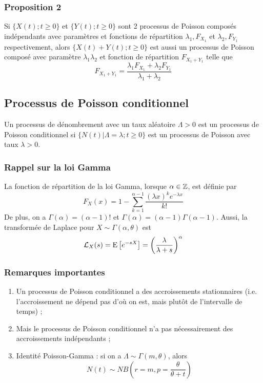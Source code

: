 \documentclass[10pt, french, landscape]{article}
\begin{document}
\begin{multicols*}{2}
\subsubsection*{Proposition 2}
Si $\{ X(t) ; t \geq 0 \}$ et $\{ Y(t) ; t \geq 0 \}$ sont 2 processus de Poisson composés indépendants avec paramètres et fonctions de répartition $\lambda_1, F_{X_1}$ et $\lambda_2, F_{Y_1}$ respectivement, alors $\{ X(t) + Y(t) ; t \geq 0 \}$ est aussi un processus de Poisson composé avec paramètre $\lambda_1  \lambda_2$ et fonction de répartition $F_{X_1 + Y_1}$ telle que
\[F_{X_1 + Y_1} = \frac{\lambda_1 F_{X_1} + \lambda_2 F_{Y_1}}{\lambda_1 + \lambda_2}  \]

\subsection*{Processus de Poisson conditionnel}
\begin{definition}[Définition]
Un processus de dénombrement avec un taux aléatoire $\Lambda > 0$ est un processus de Poisson conditionnel si $\{ N(t) | \Lambda = \lambda ; t \geq 0 \}$ est un processus de Poisson avec taux $\lambda > 0$.
\end{definition}

\subsubsection*{Rappel sur la loi Gamma}
La fonction de répartition de la loi Gamma, lorsque $\alpha \in \mathbb{Z}$, est définie par
\[F_X(x) = 1 - \sum_{k=1}^{\alpha-1} \frac{(\lambda x)^k e^{-\lambda x}}{k!}\]
De plus, on a $\Gamma(\alpha) = (\alpha-1)!$ et $\Gamma(\alpha) = (\alpha - 1) \Gamma(\alpha - 1)$. Aussi, la transformée de Laplace pour $X \sim \Gamma(\alpha, \theta)$ est
\[\mathcal{L}_X(s) = \mathrm{E} \left[ e^{-s X} \right]  = \left( \frac{\lambda}{\lambda + s} \right)^{\alpha} \]

\subsubsection*{Remarques importantes}
\begin{enumerate}[label=(\arabic*)]
\item Un processus de Poisson conditionnel a des accroissements stationnaires (i.e. l'accroissement ne dépend pas d'où on est, mais plutôt de l'intervalle de temps) ; 
\item Mais le processus de Poisson conditionnel n'a pas nécessairement des accroissements indépendants ;
\item Identité Poisson-Gamma : si on a $\Lambda \sim \Gamma(m, \theta)$, alors
\[N(t) \sim NB\left(r = m, p = \frac{\theta}{\theta + t} \right) \]


\end{enumerate}
\end{multicols*}
\end{document}

